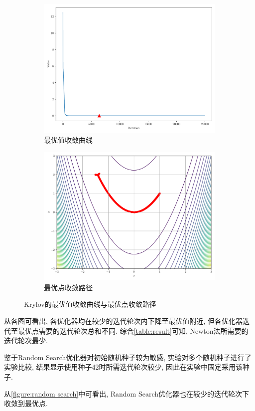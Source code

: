 \begin{figure}[!ht]
    \centering
    \begin{subfigure}{0.4\textwidth}
        \centering
        \includegraphics[width=\textwidth]{figures/Krylov_loss.pdf}
        \caption{最优值收敛曲线}
    \end{subfigure}
    \begin{subfigure}{0.4\textwidth}
        \centering
        \includegraphics[width=\textwidth]{figures/Krylov_points.pdf}
        \caption{最优点收敛路径}
    \end{subfigure}
    \caption{Krylov的最优值收敛曲线与最优点收敛路径}
    \label{figure:krylov}
\end{figure}

从各图可看出, 各优化器均在较少的迭代轮次内下降至最优值附近, 但各优化器迭代至最优点需要的迭代轮次总和不同.
综合\cref{table:result}可知, Newton法所需要的迭代轮次最少.

鉴于Random Search优化器对初始随机种子较为敏感, 实验对多个随机种子进行了实验比较, 结果显示使用种子42时所需迭代轮次较少, 因此在实验中固定采用该种子.

从\cref{figure:random search}中可看出, Random Search优化器也在较少的迭代轮次下收敛到最优点.
